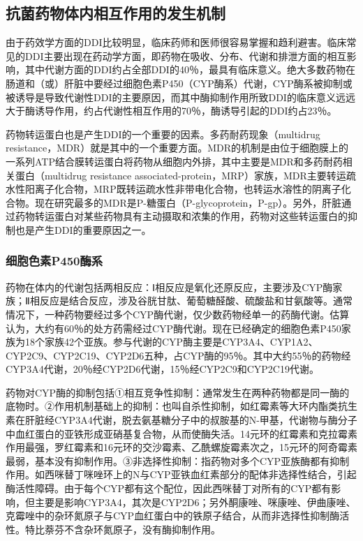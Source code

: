 \subsection{抗菌药物体内相互作用的发生机制}

由于药效学方面的DDI比较明显，临床药师和医师很容易掌握和趋利避害。临床常见的DDI主要出现在药动学方面，即药物在吸收、分布、代谢和排泄方面的相互影响，其中代谢方面的DDI约占全部DDI的40％，最具有临床意义。绝大多数药物在肠道和（或）肝脏中要经过细胞色素P450（CYP酶系）代谢，CYP酶系被抑制或被诱导是导致代谢性DDI的主要原因，而其中酶抑制作用所致DDI的临床意义远远大于酶诱导作用，约占代谢性相互作用的70％，酶诱导引起的DDI约占23％。

药物转运蛋白也是产生DDI的一个重要的因素。多药耐药现象（multidrug
resistance，MDR）就是其中的一个重要方面。MDR的机制是由位于细胞膜上的一系列ATP结合膜转运蛋白将药物从细胞内外排，其中主要是MDR和多药耐药相关蛋白（multidrug
resistance
associated-protein，MRP）家族，MDR主要转运疏水性阳离子化合物，MRP既转运疏水性非带电化合物，也转运水溶性的阴离子化合物。现在研究最多的MDR是P-糖蛋白（P-glycoprotein，P-gp）。另外，肝脏通过药物转运蛋白对某些药物具有主动摄取和浓集的作用，药物对这些转运蛋白的抑制也是产生DDI的重要原因之一。

\subsubsection{细胞色素P450酶系}

药物在体内的代谢包括两相反应：Ⅰ相反应是氧化还原反应，主要涉及CYP酶家族；Ⅱ相反应是结合反应，涉及谷胱甘肽、葡萄糖醛酸、硫酸盐和甘氨酸等。通常情况下，一种药物要经过多个CYP酶代谢，仅少数药物经单一的药酶代谢。估算认为，大约有60％的处方药需经过CYP酶代谢。现在已经确定的细胞色素P450家族为18个家族42个亚族。参与代谢的CYP酶主要是CYP3A4、CYP1A2、CYP2C9、CYP2C19、CYP2D6五种，占CYP酶的95％。其中大约55％的药物经CYP3A4代谢，20％经CYP2D6代谢，15％经CYP2C9和CYP2C19代谢。

药物对CYP酶的抑制包括①相互竞争性抑制：通常发生在两种药物都是同一酶的底物时。②作用机制基础上的抑制：也叫自杀性抑制，如红霉素等大环内酯类抗生素在肝脏经CYP3A4代谢，脱去氨基糖分子中的叔胺基的N-甲基，代谢物与酶分子中血红蛋白的亚铁形成亚硝基复合物，从而使酶失活。14元环的红霉素和克拉霉素作用最强，罗红霉素和16元环的交沙霉素、乙酰螺旋霉素次之，15元环的阿奇霉素最弱，基本没有抑制作用。③非选择性抑制：指药物对多个CYP亚族酶都有抑制作用。如西咪替丁咪唑环上的N与CYP亚铁血红素部分的配体非选择性结合，引起酶活性障碍。由于每个CYP都有这个配位，因此西咪替丁对所有的CYP都有影响，但主要是影响CYP3A4，其次是CYP2D6；另外酮康唑、咪康唑、伊曲康唑、克霉唑中的杂环氮原子与CYP血红蛋白中的铁原子结合，从而非选择性抑制酶活性。特比萘芬不含杂环氮原子，没有酶抑制作用。

